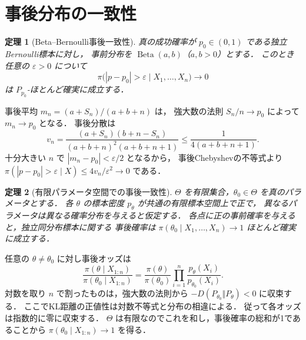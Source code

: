 \documentclass[a5paper,10pt,onecolumn]{jsarticle}
\makeatletter
\theoremstyle{mathnotetheorem}
\newtheorem{theorem}{定理}[section]
\renewcommand{\proofname}{証明}
\renewenvironment{proof}[1][\proofname]{%
  \par\pushQED{\qed}\normalfont\topsep4\p@\@plus2\p@\relax
  \trivlist\item[\hskip\labelsep\bfseries #1]\ignorespaces
}{\popQED\endtrivlist\@endpefalse}
\makeatother
\begin{document}
\section{事後分布の一致性}
\begin{theorem}[Beta--Bernoulli事後一致性]
真の成功確率が $p_0\in(0,1)$ である独立Bernoulli標本に対し，
事前分布を $\operatorname{Beta}(a,b)$（$a,b>0$）とする．
このとき任意の $\varepsilon>0$ について
\[
 \pi\bigl(|p-p_0|>\varepsilon\mid X_1,\ldots,X_n\bigr)
 \longrightarrow0
\]
は $P_{p_0}$-ほとんど確実に成立する．
\end{theorem}
\begin{proof}
事後平均 $m_n=(a+S_n)/(a+b+n)$ は，
強大数の法則 $S_n/n\to p_0$ によって $m_n\to p_0$ となる．
事後分散は
\[
 v_n=\frac{(a+S_n)(b+n-S_n)}
 {(a+b+n)^2(a+b+n+1)}
 \le\frac1{4(a+b+n+1)}.
\]
十分大きい $n$ で $|m_n-p_0|<\varepsilon/2$ となるから，
事後Chebyshevの不等式より
$\pi(|p-p_0|>\varepsilon\mid X)
\le4v_n/\varepsilon^2\to0$ である．
\end{proof}
\begin{theorem}[有限パラメータ空間での事後一致性]
$\Theta$ を有限集合，$\theta_0\in\Theta$ を真のパラメータとする．
各 $\theta$ の標本密度 $p_\theta$ が共通の有限標本空間上で正で，
異なるパラメータは異なる確率分布を与えると仮定する．
各点に正の事前確率を与えると，独立同分布標本に関する
事後確率は $\pi(\theta_0\mid X_1,\ldots,X_n)\to1$ ほとんど確実に成立する．
\end{theorem}
\begin{proof}
任意の $\theta\ne\theta_0$ に対し事後オッズは
\[
 \frac{\pi(\theta\mid X_{1:n})}{\pi(\theta_0\mid X_{1:n})}
 =\frac{\pi(\theta)}{\pi(\theta_0)}
 \prod_{i=1}^n\frac{p_\theta(X_i)}{p_{\theta_0}(X_i)}.
\]
対数を取り $n$ で割ったものは，強大数の法則から
$-D(P_{\theta_0}\Vert P_\theta)<0$ に収束する．
ここでKL距離の正値性は対数不等式と分布の相違による．
従って各オッズは指数的に零に収束する．
$\Theta$ は有限なのでこれを和し，事後確率の総和が1であることから
$\pi(\theta_0\mid X_{1:n})\to1$ を得る．
\end{proof}
\end{document}
